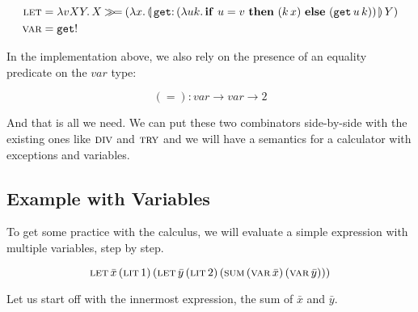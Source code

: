 \begin{align*}
  \lete &= \lam{v X Y}{X \hsbind
    (\lam{x}{\ap{\banana{\onto{\op{get}}{(\lam{u k}{\ifte{u = v}{(\ap{k}{x})}{(\app{\op{get}}{u}{k})}})}}}{Y}})} \\
  \vare &= \op{get}!
\end{align*}

In the implementation above, we also rely on the presence of an equality
predicate on the $var$ type:

 $$
  (=) : var \to var \to 2
 $$

And that is all we need. We can put these two combinators side-by-side with
the existing ones like $\textsc{div}$ and $\textsc{try}$ and we will have a semantics for
a calculator with exceptions and variables.

\subsection{Example with Variables}

To get some practice with the calculus, we will evaluate a simple
expression with multiple variables, step by step.

$$
\textsc{let}\,\bar{x}\,(\textsc{lit}\,1)\,(\textsc{let}\,\bar{y}\,(\textsc{lit}\,2)\,(\textsc{sum}\,(\textsc{var}\,\bar{x})\,(\textsc{var}\,\bar{y})))
$$

Let us start off with the innermost expression, the sum of $\bar{x}$ and
$\bar{y}$.


